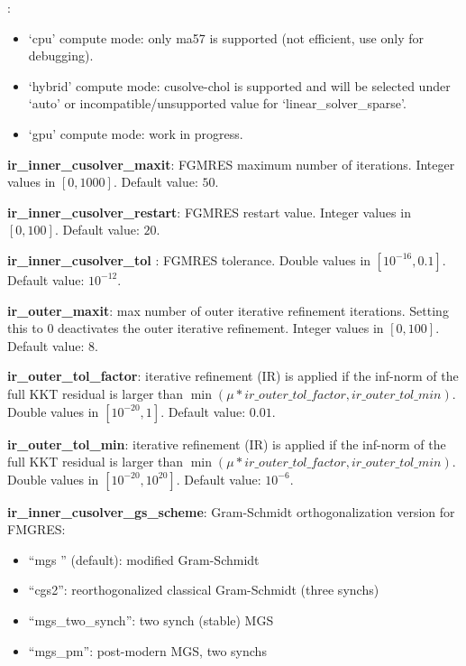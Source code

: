 : 
\begin{itemize}
  \item `cpu' compute mode: only ma57 is supported (not efficient, use only for debugging).
  \item `hybrid' compute mode: cusolve-chol is supported and will be selected under `auto' or incompatible/unsupported value for `linear\_solver\_sparse'.
  \item `gpu' compute mode: work in progress.
\end{itemize}

\noindent \textbf{ir\_inner\_cusolver\_maxit}: FGMRES maximum number of iterations. Integer values in $[0, 1000]$. Default value: $50$.
\medskip

\noindent \textbf{ir\_inner\_cusolver\_restart}: FGMRES restart value. Integer values in $[0, 100]$. Default value: $20$.
\medskip

\noindent \textbf{ir\_inner\_cusolver\_tol }: FGMRES tolerance. Double values in $[10^{-16}, 0.1]$. Default value: $10^{-12}$.
\medskip

\noindent \textbf{ir\_outer\_maxit}: max number of outer iterative refinement iterations. Setting this to 0 deactivates the outer iterative refinement. Integer values in $[0, 100]$. Default value: $8$.
\medskip

\noindent \textbf{ir\_outer\_tol\_factor}: iterative refinement (IR) is applied if the inf-norm of the full KKT residual is larger than $\min (\mu*ir\_outer\_tol\_factor,ir\_outer\_tol\_min)$. Double values in $[10^{-20}, 1]$. Default value: $0.01$.
\medskip

\noindent \textbf{ir\_outer\_tol\_min}: iterative refinement (IR) is applied if the inf-norm of the full KKT residual is larger than $\min (\mu*ir\_outer\_tol\_factor,ir\_outer\_tol\_min)$. Double values in $[10^{-20}, 10^{20}]$. Default value: $10^{-6}$.
\medskip

\noindent \textbf{ir\_inner\_cusolver\_gs\_scheme}: Gram-Schmidt orthogonalization version for FMGRES:
\begin{itemize}
\item ``mgs '' (default): modified Gram-Schmidt
\item ``cgs2'': reorthogonalized classical Gram-Schmidt (three synchs)
\item ``mgs\_two\_synch'': two synch (stable) MGS
\item ``mgs\_pm'': post-modern MGS, two synchs
\end{itemize}
\medskip

